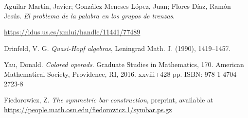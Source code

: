\documentclass[TFM.tex]{subfiles}
\begin{document}
\begin{thebibliography}{}
 Aguilar Martín, Javier; González-Meneses López, Juan; Flores Díaz, Ramón Jesús. \emph{El problema de la palabra en los grupos de trenzas}.

 \url{https://idus.us.es/xmlui/handle/11441/77489}
 
 
 Drinfeld, V. G. \emph{Quasi-Hopf algebras}, Leningrad Math. J. (1990), 1419–1457.


 Yau, Donald. \emph{Colored operads}. Graduate Studies in Mathematics, 170. American Mathematical Society, Providence, RI, 2016. xxviii+428 pp. ISBN: 978-1-4704-2723-8


 Fiedorowicz, Z. \emph{The symmetric bar construction}, preprint, available at \url{https://people.math.osu.edu/fiedorowicz.1/symbar.ps.gz}









\end{thebibliography}
\end{document}
